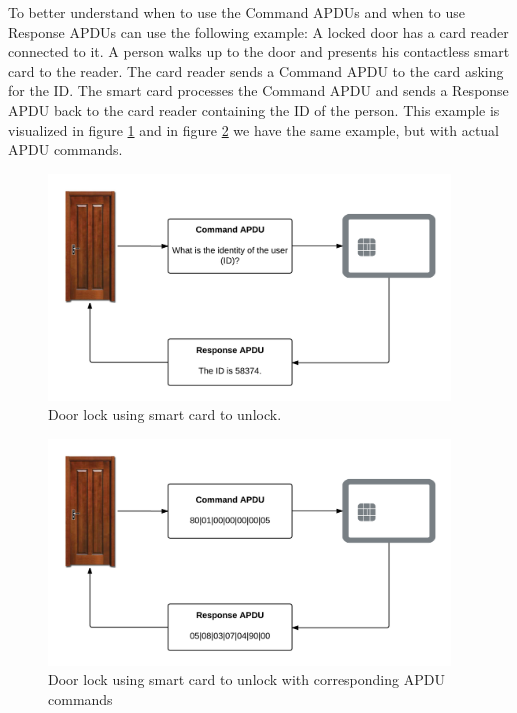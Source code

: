 To better understand when to use the Command APDUs and when to use Response APDUs can use the following example: A locked door has a card reader connected to it. A person walks up to the door and presents his contactless smart card to the reader. The card reader sends a Command APDU to the card asking for the ID. The smart card processes the Command APDU and sends a Response APDU back to the card reader containing the ID of the person. This example is visualized in figure \ref{fig:doornfc} and in figure \ref{fig:doornfcapdu} we have the same example, but with actual APDU commands.

\begin{figure}[h!]
  \caption{Door lock using smart card to unlock.}
  \label{fig:doornfc}
  \centering
    \includegraphics[width=0.95\textwidth]{images/doornfc.png}
\end{figure}


\begin{figure}[h!]
  \caption{Door lock using smart card to unlock with corresponding APDU commands}
  \label{fig:doornfcapdu}
  \centering
    \includegraphics[width=0.95\textwidth]{images/doornfc_apdu.png}
\end{figure}

